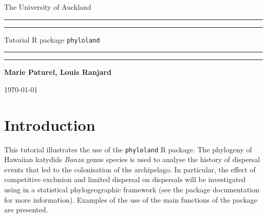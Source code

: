 \documentclass[a4paper]{article}
\begin{document}
\thispagestyle{empty}
\begin{minipage}{0.6\linewidth}
\begin{center}
\begin{large}
The University of Auckland\\
\end{large}
\end{center}
\end{minipage}


\begin{center} 
\vspace{270 pt}
\begin{Huge}
\hrule
\vspace{2pt}
\hrule
\vspace{5pt}
Tutorial R package \texttt{phyloland}\\
\vspace{5pt}
\hrule
\vspace{2pt}
\hrule
\end{Huge}
\end{center}
\begin{flushright}
\begin{Large}
\textbf{Marie Paturel, Louis Ranjard}\\
\end{Large}
\end{flushright}
\vspace{250pt}
\begin{center}
\today
\end{center}
\vspace{35pt}
\newpage

\section*{Introduction}
\hspace{12pt} This tutorial illustrates the use of the \texttt{phyloland} R package.
The phylogeny of Hawaiian katydids {\it Banza} genus species is used to analyse the history of dispersal events that led to the colonisation of the archipelago.
In particular, the effect of competitive exclusion and limited dispersal on dispersals will be investigated using in a statistical phylogeographic framework (see the package documentation for more information).
Examples of the use of the main functions of the package are presented.\\

\tableofcontents
\end{document}
